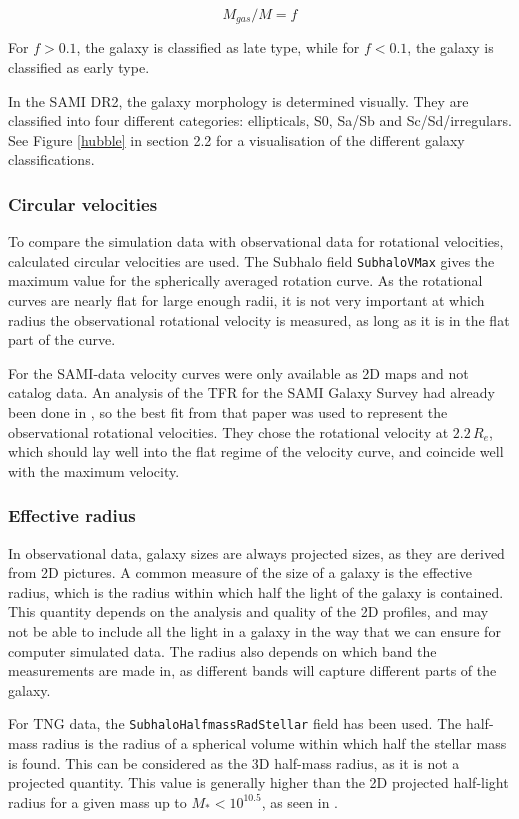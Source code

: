 \begin{equation}
    M_{gas}/M  = f
\end{equation}

For $f > 0.1$, the galaxy is classified as late type, while for $f< 0.1$, the galaxy is classified as early type.

In the SAMI DR2, the galaxy morphology is determined visually. They are classified into four different categories: ellipticals, S0, Sa/Sb and Sc/Sd/irregulars. See Figure \ref{hubble} in section 2.2 for a visualisation of the different galaxy classifications.

\subsubsection{Circular velocities}
To compare the simulation data with observational data for rotational velocities, calculated circular velocities are used. The Subhalo field \texttt{SubhaloVMax} gives the maximum value for the spherically averaged rotation curve. As the rotational curves are nearly flat for large enough radii, it is not very important at which radius the observational rotational velocity is measured, as long as it is in the flat part of the curve. 

For the SAMI-data velocity curves were only available as 2D maps and not catalog data. An analysis of the TFR for the SAMI Galaxy Survey had already been done in \cite{Bloom2017}, so the best fit from that paper was used to represent the observational rotational velocities. They chose the rotational velocity at $2.2\, R_e$, which should lay well into the flat regime of the velocity curve, and coincide well with the maximum velocity.


\subsubsection{Effective radius}
In observational data, galaxy sizes are always projected sizes, as they are derived from 2D pictures. A common measure of the size of a galaxy is the effective radius, which is the radius within which half the light of the galaxy is contained. This quantity depends on the analysis and quality of the 2D profiles, and may not be able to include all the light in a galaxy in the way that we can ensure for computer simulated data. The radius also depends on which band the measurements are made in, as different bands will capture different parts of the galaxy.

For TNG data, the \texttt{SubhaloHalfmassRadStellar} field has been used. The half-mass radius is the radius of a spherical volume within which half the stellar mass is found. This can be considered as the 3D half-mass radius, as it is not a projected quantity. This value is generally higher than the 2D projected half-light radius for a given mass up to $M_{*} < 10^{10.5}$, as seen in \parencite{Genel2017}.

